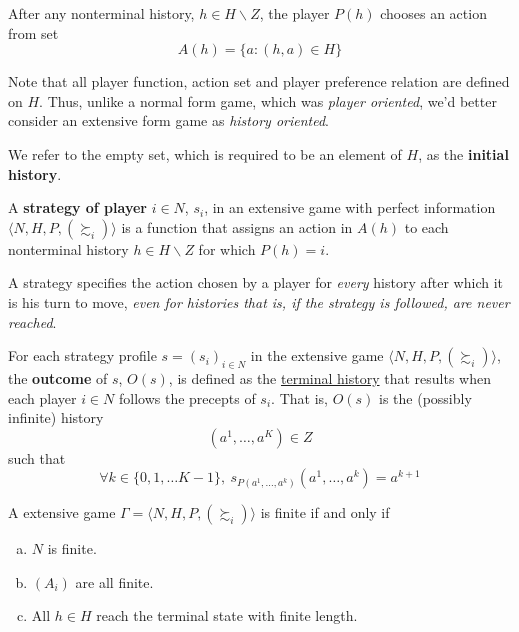 \documentclass[11pt]{article}
\begin{document}
			\begin{notation}
				After any nonterminal history, $h \in H \backslash Z$, the player $P(h)$ chooses an action from set
				\[
					A(h) = \{a: (h, a) \in H\}
				\]
			\end{notation}
			
			\begin{remark}
				Note that all player function, action set and player preference relation are defined on $H$. Thus, unlike a normal form game, which was \emph{player oriented}, we'd better consider an extensive form game as \emph{history oriented}.
			\end{remark}
			
			\begin{definition}[pg.90]
				We refer to the empty set, which is required to be an element of $H$, as the \textbf{initial history}.
			\end{definition}
			
			\begin{definition}[92.1]
				A \textbf{strategy of player} $i \in N$, $s_i$, in an extensive game with perfect information $\langle N, H, P, (\succsim_i) \rangle$ is a function that assigns an action in $A(h)$ to each nonterminal history $h \in H \backslash Z$ for which $P(h) = i$.
			\end{definition}
			
			\begin{remark}[pg.92]
				A strategy specifies the action chosen by a player for \emph{every} history after which it is his turn to move, \emph{even for histories that is, if the strategy is followed, are never reached}.
			\end{remark}
			
			\begin{definition}[pg.93]
				For each strategy profile $s = (s_i)_{i \in N}$ in the extensive game $\langle N, H, P, (\succsim_i) \rangle$, the \textbf{outcome} of $s$, $O(s)$, is defined as the \ul{terminal history} that results when each player $i \in N$ follows the precepts of $s_i$. That is, $O(s)$ is the (possibly infinite) history
				\[
					(a^1, \dots, a^K) \in Z
				\]
				such that
				\[
					\forall k \in \{0, 1, \dots K-1\},\ s_{P(a^1, \dots, a^k)}(a^1, \dots, a^k) = a^{k+1}
				\]
			\end{definition}
			
			\begin{definition}[lec.6]
				A extensive game $\Gamma = \langle N, H, P, (\succsim_i) \rangle$ is finite if and only if 
				\begin{enumerate}[(a)]
					\item $N$ is finite.
					\item $(A_i)$ are all finite.
					\item All $h \in H$ reach the terminal state with finite length.
				\end{enumerate}
			\end{definition}
			
\end{document}
